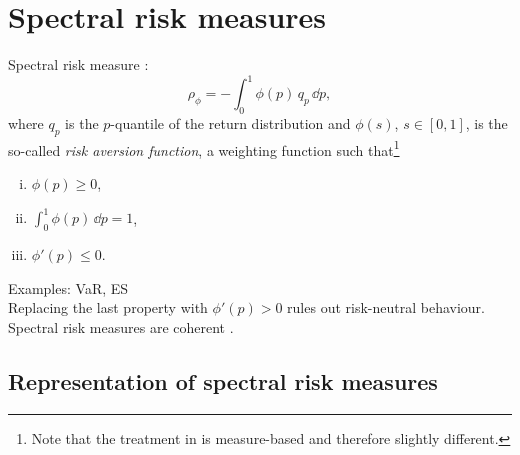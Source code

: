 \documentclass[square]{article} %
\theoremstyle{plain}
\theoremstyle{definition} %
\begin{document}

\section{Spectral risk measures}
\label{sec:spectr-risk-meas}

Spectral risk measure \citep{Acerbi2002,Cotter2006}:
\begin{equation*}
\rho_\phi = -\int_0^1 \phi(p)\, q_p\, \dd p,
\end{equation*}
where $q_p$ is the $p$-quantile of the return distribution and
$\phi(s)$, $s\in [0,1]$, is the so-called {\em risk aversion
  function\/}, a weighting function such that\footnote{Note that the
  treatment in \citep{Acerbi2002} is measure-based and therefore
  slightly different.} 
\begin{enumerate}[(i)]
\item $\phi(p)\geq 0$,
\item $\int_0^1\phi(p)\, \dd p=1$,
\item $\phi'(p)\leq 0$. 
\end{enumerate}
Examples: VaR, ES\\
Replacing the last property with $\phi'(p)>0$ rules out risk-neutral
behaviour. \\
Spectral risk measures are coherent \citep{Acerbi2002}. 

\subsection{Representation of spectral risk measures}
\label{sec:repr-spectr-risk}
\end{document}
